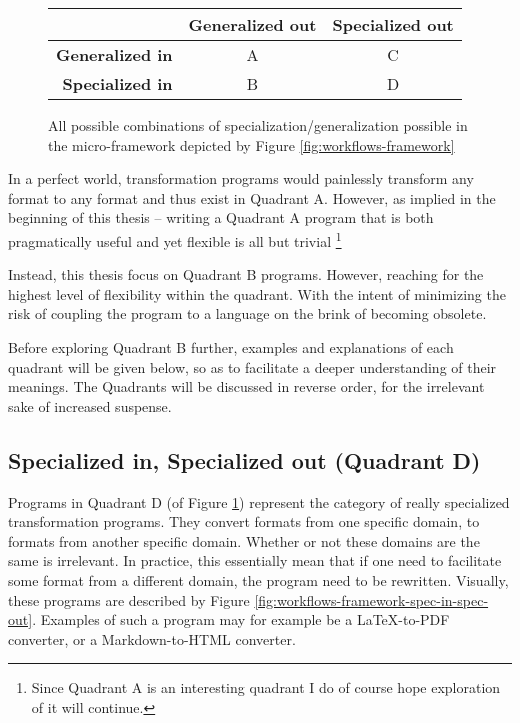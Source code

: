 \documentclass{scrreprt}
\begin{document}
\begin{figure}[h]
  \centering

  \def\arraystretch{2.5}
  \begin{tabular}{|r|c|c|}
    \hline

    & \textbf{Generalized out} & \textbf{Specialized out} \\ \hline

    \textbf{Generalized in} &
    \cellcolor[HTML]{33FF99} A
    &
    \cellcolor[HTML]{FFFFCC} C

    \\ \hline

    \textbf{Specialized in} &
    \cellcolor[HTML]{CCFF99} B
    &
    \cellcolor[HTML]{FFFFFF} D

    \\ \hline
  \end{tabular}

  \caption{All possible combinations of specialization/generalization possible in the micro-framework depicted by Figure \ref{fig:workflows-framework}}
  \label{fig:microframework-quadrant}
\end{figure}


In a perfect world, transformation programs would painlessly transform any format to any format and thus exist in  Quadrant A. However, as implied in the beginning of this thesis -- writing a Quadrant A program that is both pragmatically useful and yet flexible is all but trivial \footnote{Since Quadrant A is an interesting quadrant I do of course hope exploration of it will continue.}

Instead, this thesis focus on Quadrant B programs. However, reaching for the highest level of flexibility within the quadrant. With the intent of minimizing the risk of coupling the program to a language on the brink of becoming obsolete.

Before exploring Quadrant B further, examples and explanations of each quadrant will be given below, so as to facilitate a deeper understanding of their meanings. The Quadrants will be discussed in reverse order, for the irrelevant sake of increased suspense.





\subsection{Specialized in, Specialized out (Quadrant D)}
Programs in Quadrant D (of Figure \ref{fig:microframework-quadrant}) represent the category of really specialized transformation programs. They convert formats from one specific domain, to formats from another specific domain. Whether or not these domains are the same is irrelevant. In practice, this essentially mean that if one need to facilitate some format from a different domain, the program need to be rewritten. Visually, these programs are described by Figure \ref{fig:workflows-framework-spec-in-spec-out}. Examples of such a program may for example be a \LaTeX{}-to-PDF converter, or a Markdown-to-HTML converter. 
\end{document}
